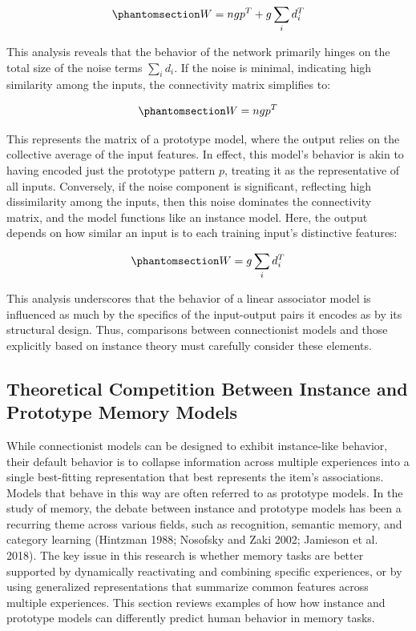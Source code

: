 \documentclass[
  letterpaper,
  11pt,
  english,
  singlespacing,
  headsepline]{MastersDoctoralThesis}
\begin{document}
\begin{equation}\phantomsection\label{eq-intro10}{
W = ngp^T + g \sum_i d_i^T
}\end{equation}

This analysis reveals that the behavior of the network primarily hinges
on the total size of the noise terms \(\sum_i d_i\). If the noise is
minimal, indicating high similarity among the inputs, the connectivity
matrix simplifies to:

\begin{equation}\phantomsection\label{eq-intro11}{
W = ngp^T
}\end{equation}

This represents the matrix of a prototype model, where the output relies
on the collective average of the input features. In effect, this model's
behavior is akin to having encoded just the prototype pattern \(p\),
treating it as the representative of all inputs. Conversely, if the
noise component is significant, reflecting high dissimilarity among the
inputs, then this noise dominates the connectivity matrix, and the model
functions like an instance model. Here, the output depends on how
similar an input is to each training input's distinctive features:

\begin{equation}\phantomsection\label{eq-intro12}{
W = g \sum_i d_i^T
}\end{equation}

This analysis underscores that the behavior of a linear associator model
is influenced as much by the specifics of the input-output pairs it
encodes as by its structural design. Thus, comparisons between
connectionist models and those explicitly based on instance theory must
carefully consider these elements.

\subsection{Theoretical Competition Between Instance and Prototype
Memory
Models}\label{theoretical-competition-between-instance-and-prototype-memory-models}

While connectionist models can be designed to exhibit instance-like
behavior, their default behavior is to collapse information across
multiple experiences into a single best-fitting representation that best
represents the item's associations. Models that behave in this way are
often referred to as prototype models. In the study of memory, the
debate between instance and prototype models has been a recurring theme
across various fields, such as recognition, semantic memory, and
category learning (Hintzman 1988; Nosofsky and Zaki 2002; Jamieson et
al. 2018). The key issue in this research is whether memory tasks are
better supported by dynamically reactivating and combining specific
experiences, or by using generalized representations that summarize
common features across multiple experiences. This section reviews
examples of how how instance and prototype models can differently
predict human behavior in memory tasks.
\end{document}
